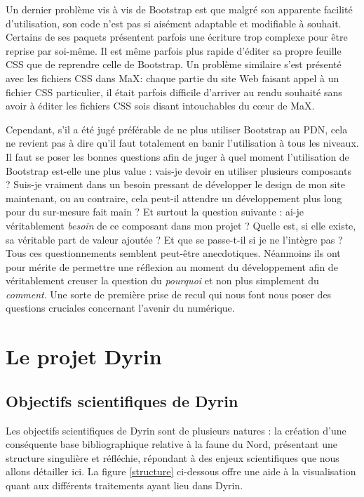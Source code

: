\documentclass[a4paper,12pt,twoside]{book}
\begin{document}
 Un dernier problème vis à vis de Bootstrap est que malgré son apparente facilité d'utilisation, son code n'est pas si aisément adaptable et modifiable à souhait. Certains de ses paquets présentent parfois une écriture trop complexe pour être reprise par soi-même. Il est même parfois plus rapide d'éditer sa propre feuille CSS que de reprendre celle de Bootstrap. Un problème similaire s'est présenté avec les fichiers CSS dans MaX: chaque partie du site Web faisant appel à un fichier CSS particulier, il était parfois difficile d'arriver au rendu souhaité sans avoir à éditer les fichiers CSS sois disant intouchables du \og c\oe{}ur\fg{} de MaX.


Cependant, s'il a été jugé préférable de ne plus utiliser Bootstrap au \acrshort{PDN}, cela ne revient pas à dire qu'il faut totalement en banir l'utilisation à tous les niveaux. Il faut se poser les bonnes questions afin de juger à quel moment l'utilisation de Bootstrap est-elle une plus value : vais-je devoir en utiliser plusieurs composants ? Suis-je vraiment dans un besoin pressant de développer le design de mon site maintenant, ou au contraire, cela peut-il attendre un développement plus long pour du sur-mesure fait main ? Et surtout la question suivante : ai-je véritablement \textit{besoin} de ce composant dans mon projet ? Quelle est, si elle existe, sa véritable part de valeur ajoutée ? Et que se passe-t-il si je ne l'intègre pas ? Tous ces questionnements semblent peut-être anecdotiques. Néanmoins ils ont pour mérite de permettre une réflexion au moment du développement afin de véritablement creuser la question du \textit{pourquoi} et non plus simplement du \textit{comment}. Une sorte de première prise de recul qui nous font nous poser des questions cruciales concernant l'avenir du numérique.

\part{Le projet Dyrin}

\chapter{Objectifs scientifiques de Dyrin}
Les objectifs scientifiques de Dyrin sont de plusieurs natures : la création d'une conséquente base bibliographique relative à la faune du Nord, présentant une structure singulière et réfléchie, répondant à des enjeux scientifiques que nous allons détailler ici. La figure \ref{structure} ci-dessous offre une aide à la visualisation quant aux différents traitements ayant lieu dans Dyrin.
\end{document}
